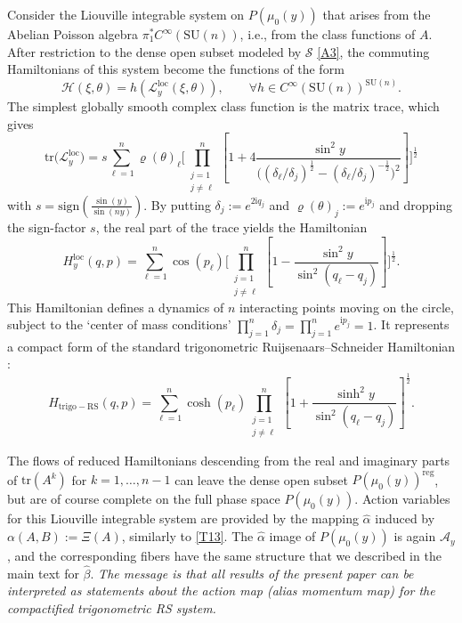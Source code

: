\documentclass[a4paper,11pt,reqno]{amsart}
\theoremstyle{definition}
\numberwithin{equation}{section}
\newcommand{\be}{\begin{equation}}
\newcommand{\ee}{\end{equation}}
\def\cA{{\mathcal A}}                       %
\def\loc{\mathrm{loc}}                      %
\def\reg{\mathrm{reg}}                      %
\def\ri{{\mathrm{i}}}                       %
\def\tr{\mathrm{tr}}                        %
\def\SU{\mathrm{SU}}                        %
\def\cH{{\mathcal H}}                       %
\def\reg{\mathrm{reg}}                      %
\def\cL{{\mathcal L}}                       %
\def\cS{{\mathcal S}}                       %
\begin{document}
Consider the Liouville integrable system on $P(\mu_0(y))$ that arises from the
Abelian Poisson algebra $\pi_1^* C^\infty(\SU(n))$, i.e., from the class functions of $A$.
 After restriction to the dense open subset modeled by $\cS$ \eqref{A3}, the commuting Hamiltonians of this system become
 the functions of the form
\be
\cH(\xi, \theta) = h( \cL_y^\loc(\xi,\theta)), \qquad \forall h \in C^\infty(\SU(n))^{\SU(n)}.
\label{A4}\ee
The simplest globally smooth complex class function is the matrix trace, which gives
\be
 \tr \bigl(\cL_y^\loc\bigr)=  s \sum_{\ell =1}^n \varrho(\theta)_\ell
 \Biggl[ \prod_{\substack{j=1\\j \neq \ell}}^n \left[ 1 + 4 \frac{\sin^2 y}
{ \bigl((\delta_\ell/\delta_j)^{\frac{1}{2}} - (\delta_\ell/\delta_j)^{-\frac{1}{2}}\bigr)^2} \right] \Biggr]^{\frac{1}{2}}
\label{A5}\ee
with
$s= {\mathrm{sign}}\left(\frac{ \sin(y)}{\sin(ny)}\right)$.
By putting $\delta_j:= e^{2 \ri q_j}$ and $\varrho(\theta)_j:= e^{\ri p_j}$ and dropping the sign-factor $s$,
the real part of the trace yields the Hamiltonian
\be
H_y^\loc(q,p) = \sum_{\ell=1}^n \cos (p_\ell)
\Biggl[ \prod_{\substack{j=1\\j \neq \ell}}^n \left[ 1 -\frac{\sin^2 y}
{ \sin^2(q_\ell - q_j)} \right] \Biggr]^{\frac{1}{2}}.
\label{A6}\ee
This Hamiltonian  defines a dynamics of $n$ interacting points moving on the circle, subject to
the `center of mass conditions' $\prod_{j=1}^n \delta_j = \prod_{j=1}^n e^{\ri p_j} =1$.
It represents  a compact form of the standard trigonometric Ruijsenaars--Schneider Hamiltonian \cite{RS}:
\be
H_{\mathrm{trigo-RS}}(q,p) = \sum_{\ell=1}^n \cosh (p_\ell)
 \prod_{\substack{j=1\\j \neq \ell}}^n \left[ 1 +\frac{\sinh^2 y}
{ \sin^2(q_\ell - q_j)} \right]^{\frac{1}{2}}.
\label{A7}\ee


The flows of reduced Hamiltonians descending from the real and imaginary parts of $\tr(A^k)$ for $k=1,\dots, n-1$
can leave the dense open subset $P(\mu_0(y))^\reg$,
but are of course complete on the full phase space  $P(\mu_0(y))$. Action variables for this Liouville integrable system
are provided by the mapping $\hat \alpha$ induced by $\alpha(A,B):= \Xi(A)$, similarly to \eqref{T13}.
The $\hat \alpha$ image of $P(\mu_0(y))$ is again $\cA_y$,   and the corresponding fibers have the same structure that we described
in the main text for $\hat \beta$.
\emph{The message is that all results of the present paper can be interpreted as statements about the action map (alias momentum map)
for the compactified trigonometric RS system.}
\end{document}
